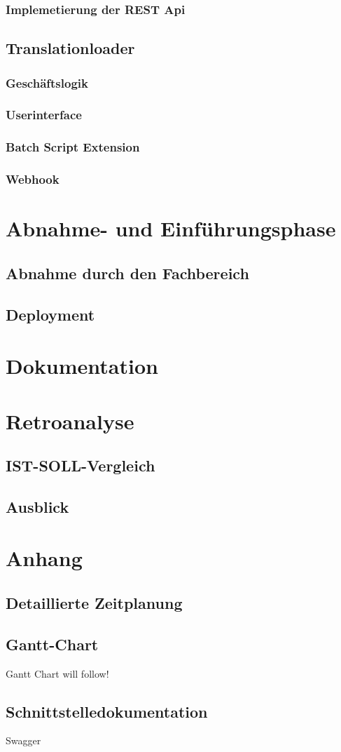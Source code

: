 \documentclass[oneside]{article}
\begin{document}
  \subsubsection{Implemetierung der REST Api}
  \subsection{Translationloader}
  \subsubsection{Geschäftslogik}
  \subsubsection{Userinterface}
  \subsubsection{Batch Script Extension}
  \subsubsection{Webhook}
  \section{Abnahme- und Einführungsphase}
  \subsection{Abnahme durch den Fachbereich}
  \subsection{Deployment}
  \section{Dokumentation}
  \section{Retroanalyse}
  \subsection{IST-SOLL-Vergleich}
  \subsection{Ausblick}
  \setcounter{section}{0}
  \renewcommand{\thesection}{\MakeUppercase{\alph{section}}}
  \section{Anhang}
  \subsection{Detaillierte Zeitplanung}\label{sec:detailTime}
  \subsection{Gantt-Chart}\label{sec:GanttChart}
    Gantt Chart will follow!
    \newpage
  
    
  \subsection{Schnittstelledokumentation}
    \label{interfaceDocumentation}
  Swagger
\end{document}
